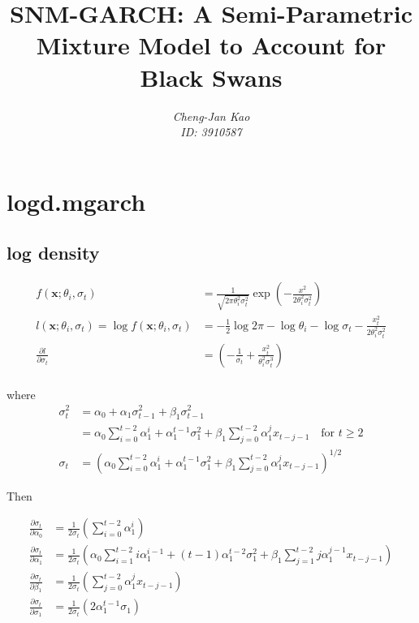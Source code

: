 \documentclass[a4paper, 12pts]{article}
\title{\bf SNM-GARCH: A Semi-Parametric Mixture Model to Account for Black
Swans}
\author{\em Cheng-Jan Kao \\ ID: 3910587}
\date{}
\begin{document}
\maketitle


\section{logd.mgarch}
\label{sec:logd.mgarch}

\subsection{log density}

\begin{align*}
  f(\mathbf{x}; \theta_i, \sigma_t) &= \frac{1}{\sqrt{2 \pi \theta_i^2
      \sigma_t^2}} \exp \left( -\frac{x^2}{2 \theta_i^2 \sigma_t^2}
  \right)\\
  l(\mathbf{x}; \theta_i, \sigma_t) = \log f(\mathbf{x}; \theta_i,
  \sigma_t) &= -\frac{1}{2}\log 2 \pi - \log{\theta_i} -
  \log{\sigma_t} - \frac{x_t^2}{2\theta_i^2 \sigma_t^2}\\
  \frac{\partial l}{\partial \sigma_t} &= \left( -\frac{1}{\sigma_t} +
    \frac{x_t^2}{\theta_i^2 \sigma_t^3}\right)\\
\end{align*}

where
\begin{align*}
  \sigma_t^2 &= \alpha_0 + \alpha_1 \sigma_{t-1}^2 + \beta_1
  \sigma_{t-1}^2\\
  &= \alpha_0 \sum_{i = 0}^{t - 2} \alpha_1^i + \alpha_1^{t - 1}
  \sigma_1^2 + \beta_1 \sum_{j = 0}^{t - 2} \alpha_1^j x_{t - j - 1}
  \quad
  \text{for} \, \, t \ge 2\\
  \sigma_t &= \left(\alpha_0 \sum_{i = 0}^{t - 2} \alpha_1^i +
    \alpha_1^{t - 1} \sigma_1^2 + \beta_1 \sum_{j = 0}^{t - 2} \alpha_1^j
    x_{t - j - 1}\right)^{1/2}
\end{align*}

Then

\begin{align*}
  \frac{\partial\sigma_t}{\partial\alpha_0} &=
  \frac{1}{2\sigma_t}\left( \sum_{i = 0}^{t-2} \alpha_1^i \right)\\
  \frac{\partial \sigma_t}{\partial \alpha_1} &= \frac{1}{2\sigma_t}
  \left( \alpha_0 \sum_{i = 1}^{t - 2} i\alpha_1^{i -1} + (t -
    1)\alpha_1^{t - 2} \sigma_1^2 +
    \beta_1 \sum_{j = 1}^{t - 2} j \alpha_1^{j - 1} x_{t - j - 1}\right)\\
  \frac{\partial \sigma_t}{\partial \beta_1} &=
  \frac{1}{2\sigma_t} \left(\sum_{j = 0}^{t - 2}
  \alpha_1^j x_{t - j - 1} \right)\\
  \frac{\partial \sigma_t}{\partial \sigma_1} &=
  \frac{1}{2\sigma_t}\left(2\alpha_1^{t-1}\sigma_1\right)\\
\end{align*}
\end{document}
